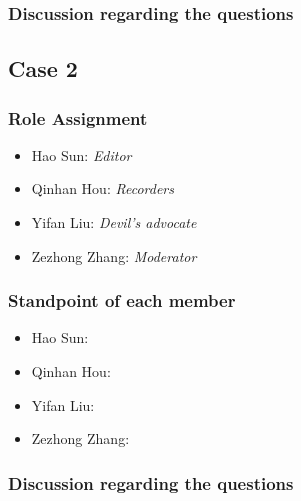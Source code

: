 		\subsubsection{Discussion regarding the questions}

	\subsection{Case 2}
		\subsubsection{Role Assignment}
		\begin{itemize}
  			\item Hao Sun: \emph{Editor}
  			\item Qinhan Hou: \emph{Recorders}
  			\item Yifan Liu: \emph{Devil’s advocate}
  			\item Zezhong Zhang: \emph{Moderator}
		\end{itemize}
		\subsubsection{Standpoint of each member}
		\begin{itemize}
  			\item Hao Sun: 
  			\item Qinhan Hou:
  			\item Yifan Liu: 
  			\item Zezhong Zhang:
		\end{itemize}
		\subsubsection{Discussion regarding the questions}